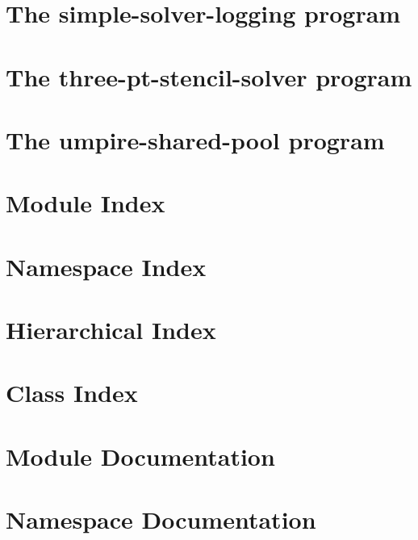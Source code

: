 \let\mypdfximage\pdfximage\def\pdfximage{\immediate\mypdfximage}\documentclass[twoside]{book}
\newcommand{\+}{\discretionary{\mbox{\scriptsize$\hookleftarrow$}}{}{}}
\begin{document}
\chapter{The simple-\/solver-\/logging program}
\label{simple_solver_logging}

\chapter{The three-\/pt-\/stencil-\/solver program}
\label{three_pt_stencil_solver}

\chapter{The umpire-\/shared-\/pool program}
\label{umpire_shared_pool}

\chapter{Module Index}

\chapter{Namespace Index}

\chapter{Hierarchical Index}

\chapter{Class Index}

\chapter{Module Documentation}



















\chapter{Namespace Documentation}



















\end{document}
